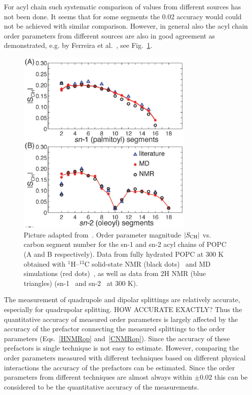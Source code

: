 \documentclass[aps,prl,superscriptaddress,twocolumn]{revtex4}
\begin{document}
For acyl chain such systematic comparison of values from different sources has not been done. It seems that for some segments the 0.02 accuracy would
could not be achieved with similar comparison. However, in general also the acyl chain order parameters from different sources are also in good agreement
as demonstrated, e.g. by Ferreira et al.~\cite{ferreira13}, see Fig.~\ref{CHAINorderparameters}.
\begin{figure}[]
  \includegraphics[width=8.6cm]{../Fig/acylCHAINopBYferreira.eps}
\newline
  \caption{\label{CHAINorderparameters}
    Picture adapted from~\cite{ferreira13}.
    Order parameter magnitude $|S_{{\rm CH}}|$ vs. carbon segment number for the
    sn-1 and sn-2 acyl chains of POPC (A and B respectively). Data from fully hydrated POPC at
    300 K obtained with $^1$H–$^{13}$C solid-state NMR (black dots)~\cite{ferreira13} and MD simulations
    (red dots)~\cite{ferreira13}, as well as data from 2H NMR (blue triangles) (sn-1~\cite{seelig78} and
    sn-2~\cite{seelig78,perly85} at 300 K).
} 
\end{figure}

The measurement of quadrupole and dipolar splittings are relatively accurate, especially for quadrupolar splitting.
HOW ACCURATE EXACTLY? Thus the quantitative accuracy of measured order parameters is largely affected by the accuracy 
of the prefactor connecting the measured splittings to the order parameters (Eqs.~\ref{HNMRop} and~\ref{CNMRop}). 
Since the accuracy of these prefactors is single technique is not easy to estimate.
However, comparing the order parameters measured with different techniques based on different physical interactions 
the accuracy of the prefactors can be estimated. Since the order parameters from different techniques are 
almost always within $\pm$0.02 this can be considered to be the quantitative accuracy of the measurements.
\end{document}
